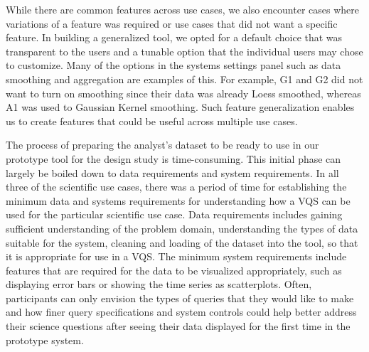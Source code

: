 {
\par While there are common features across use cases, we also encounter cases where variations of a feature was required or use cases that did not want a specific feature. In building a generalized tool, we opted for a default choice that was transparent to the users and a tunable option that the individual users may chose to customize. Many of the options in the systems settings panel such as data smoothing and aggregation are examples of this. For example, G1 and G2 did not want to turn on smoothing since their data was already Loess smoothed, whereas A1 was used to Gaussian Kernel smoothing. Such feature generalization enables us to create features that could be useful across multiple use cases.

\par The process of preparing the analyst's dataset to be ready to use in our prototype tool for the design study is time-consuming. This initial phase can largely be boiled down to data requirements and system requirements. In all three of the scientific use cases, there was a period of time for establishing the minimum data and systems requirements for understanding how a VQS can be used for the particular scientific use case. Data requirements includes gaining sufficient understanding of the problem domain, understanding the types of data suitable for the system, cleaning and loading of the dataset into the tool, so that it is appropriate for use in a VQS. The minimum system requirements include features that are required for the data to be visualized appropriately, such as displaying error bars or showing the time series as scatterplots. Often, participants can only envision the types of queries that they would like to make and how finer query specifications and system controls could help better address their science questions after seeing their data displayed for the first time in the prototype system.

}
